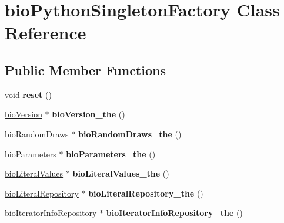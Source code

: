 \hypertarget{classbio_python_singleton_factory}{}\section{bio\+Python\+Singleton\+Factory Class Reference}
\label{classbio_python_singleton_factory}
\subsection*{Public Member Functions}
\begin{DoxyCompactItemize}
\item 
\mbox{\label{classbio_python_singleton_factory_a04482836c46458af6e0c87f73e6d43e0}} 
void {\bfseries reset} ()
\item 
\mbox{\label{classbio_python_singleton_factory_ae2a38d30d3830fb573a274e8ab8d69be}} 
\hyperlink{classbio_version}{bio\+Version} $\ast$ {\bfseries bio\+Version\+\_\+the} ()
\item 
\mbox{\label{classbio_python_singleton_factory_a1ff498b9f5d05545b7c868a0927f0b29}} 
\hyperlink{classbio_random_draws}{bio\+Random\+Draws} $\ast$ {\bfseries bio\+Random\+Draws\+\_\+the} ()
\item 
\mbox{\label{classbio_python_singleton_factory_ac256abb0e62768e2dd3ae85745276bb3}} 
\hyperlink{classbio_parameters}{bio\+Parameters} $\ast$ {\bfseries bio\+Parameters\+\_\+the} ()
\item 
\mbox{\label{classbio_python_singleton_factory_a6a54f6c1f64bd23a825e277b551355d0}} 
\hyperlink{classbio_literal_values}{bio\+Literal\+Values} $\ast$ {\bfseries bio\+Literal\+Values\+\_\+the} ()
\item 
\mbox{\label{classbio_python_singleton_factory_a6f0e1811af1bc6fb8aa36a54abf341fd}} 
\hyperlink{classbio_literal_repository}{bio\+Literal\+Repository} $\ast$ {\bfseries bio\+Literal\+Repository\+\_\+the} ()
\item 
\mbox{\label{classbio_python_singleton_factory_aabec04f5c92fe11de5df5559596669f3}} 
\hyperlink{classbio_iterator_info_repository}{bio\+Iterator\+Info\+Repository} $\ast$ {\bfseries bio\+Iterator\+Info\+Repository\+\_\+the} ()
\end{DoxyCompactItemize}

